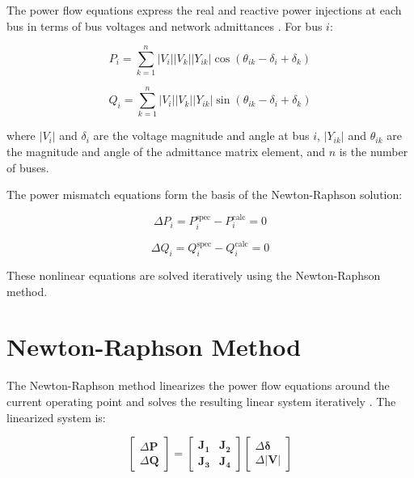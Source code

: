 \documentclass[11pt,a4paper]{article}
\begin{document}
The power flow equations express the real and reactive power injections at each bus in terms of bus voltages and network admittances \cite{Pai1989,Kundur1994}. For bus $i$:

\begin{equation}
P_i = \sum_{k=1}^{n} |V_i||V_k||Y_{ik}|\cos(\theta_{ik} - \delta_i + \delta_k)
\end{equation}

\begin{equation}
Q_i = \sum_{k=1}^{n} |V_i||V_k||Y_{ik}|\sin(\theta_{ik} - \delta_i + \delta_k)
\end{equation}

where $|V_i|$ and $\delta_i$ are the voltage magnitude and angle at bus $i$, $|Y_{ik}|$ and $\theta_{ik}$ are the magnitude and angle of the admittance matrix element, and $n$ is the number of buses.

The power mismatch equations form the basis of the Newton-Raphson solution:

\begin{equation}
\Delta P_i = P_i^{\text{spec}} - P_i^{\text{calc}} = 0
\end{equation}

\begin{equation}
\Delta Q_i = Q_i^{\text{spec}} - Q_i^{\text{calc}} = 0
\end{equation}

These nonlinear equations are solved iteratively using the Newton-Raphson method.

\section{Newton-Raphson Method}

The Newton-Raphson method linearizes the power flow equations around the current operating point and solves the resulting linear system iteratively \cite{Arrillaga2008,Saadat1999}. The linearized system is:

\begin{equation}
\begin{bmatrix}
\Delta \mathbf{P} \\
\Delta \mathbf{Q}
\end{bmatrix}
=
\begin{bmatrix}
\mathbf{J_1} & \mathbf{J_2} \\
\mathbf{J_3} & \mathbf{J_4}
\end{bmatrix}
\begin{bmatrix}
\Delta \boldsymbol{\delta} \\
\Delta \mathbf{|V|}
\end{bmatrix}
\end{equation}
\end{document}
